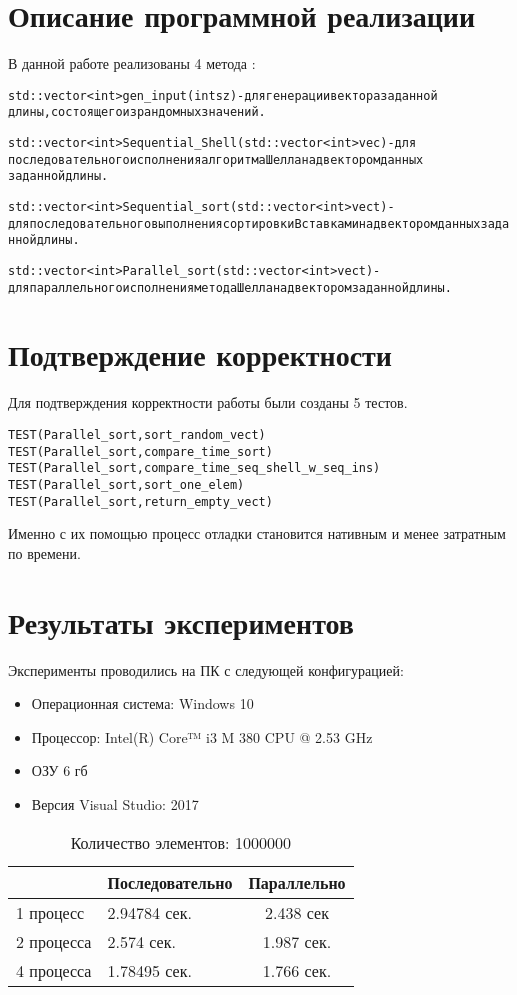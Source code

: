 \documentclass[12pt, letterpaper]{report}
\begin{document}
\section{Описание программной реализации}
В данной работе реализованы 4 метода :
\begin{alltt}
std::vector<int> gen_input(int sz) {} - для генерации вектора заданной 
длины,состоящего из рандомных значений.

std::vector<int> Sequential_Shell(std::vector<int> vec) {} - для
последовательного исполнения алгоритма Шелла над вектором данных 
заданной длины.

std::vector<int> Sequential_sort(std::vector<int> vect) {} - для последовательного выполнения сортировки Вставками над вектором данных заданной длины.

std::vector<int> Parallel_sort(std::vector<int> vect) {} - для параллельного исполнения метода Шелла над вектором заданной длины.
\end{alltt}
\section{Подтверждение корректности}
Для подтверждения корректности работы были созданы 5 тестов.
\begin{alltt}
TEST(Parallel_sort, sort_random_vect) {}
TEST(Parallel_sort, compare_time_sort) {}
TEST(Parallel_sort, compare_time_seq_shell_w_seq_ins) {}
TEST(Parallel_sort, sort_one_elem) {}
TEST(Parallel_sort, return_empty_vect) {}
\end{alltt}
Именно с их помощью процесс отладки становится нативным и менее затратным по
времени.
\section{Результаты экспериментов}
Эксперименты проводились на ПК с следующей конфигурацией:
\begin{itemize}
\item Операционная система: Windows 10
\item Процессор: Intel(R) Core™ i3 M 380 CPU @ 2.53 GHz
\item ОЗУ 6 гб
\item Версия Visual Studio: 2017
\end{itemize}
\begin{table}[h]
  \caption{Количество элементов: 1000000}
  \centering
\begin{tabular}{ || l | l | c || }
\hline
 & Последовательно  & Параллельно  \\ \hline
1 процесс & 2.94784 сек. & 2.438 сек \\ \hline
2 процесса & 2.574 сек. & 1.987 сек.  \\ \hline
4 процесса & 1.78495 сек. & 1.766 сек. \\
\hline
\end{tabular}
\label{table:performance}
\end{table}
\end{document}
